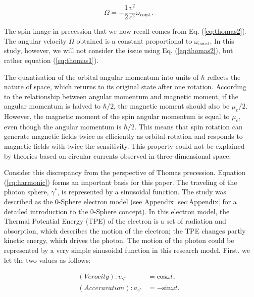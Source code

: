 \documentclass[%
 reprint,
 amsmath,amssymb,
 aps,
]{revtex4-1}
\numberwithin{equation}{section}%
\begin{document}
\begin{equation}
    {\Omega}= - \frac{1}{2} \frac{v^2}{c^2} \omega_{\mathrm{const}}.
    \label{eq:thomas2}
\end{equation}

The spin image in precession that we now recall comes from Eq. (\ref{eq:thomas2}). The angular velocity $\Omega$ obtained is a constant proportional to $\omega_{\mathrm{const}}$. In this study, however, we will not consider the issue using Eq. (\ref{eq:thomas2}), but rather equation (\ref{eq:thomas1}).

    
The quantisation of the orbital angular momentum into units of $\hbar$ reflects the nature of space, which returns to its original state after one rotation. According to the relationship between angular momentum and magnetic moment, if the angular momentum is halved to $\hbar/2$, the magnetic moment should also be $\mu_e/2$. However, the magnetic moment of the spin angular momentum is equal to $\mu_e$, even though the angular momentum is $\hbar/2$. This means that spin rotation can generate magnetic fields twice as efficiently as orbital rotation and responds to magnetic fields with twice the sensitivity. This property could not be explained by theories based on circular currents observed in three-dimensional space.

Consider this discrepancy from the perspective of Thomas precession. Equation (\ref{eq:harmonic}) forms an important basis for this paper. The traveling of the photon sphere, ${\gamma^{*}}$, is represented by a sinusoidal function. The study was described as the 0-Sphere electron model (see Appendix \ref{sec:Appendix} for a detailed introduction to the 0-Sphere concept). In this electron model, the Thermal Potential Energy (TPE) of the electron is a set of radiation and absorption, which describes the motion of the electron; the TPE changes partly kinetic energy, which drives the photon. The motion of the photon could be represented by a very simple sinusoidal function in this research model. First, we let the two values as follows;

\begin{equation}
    \begin{split}
        (Verocity): v_{\gamma^{*}}
            &= \mathrm{cos}\omega t , \\
        (Acceraration): a_{\gamma^{*}}
            &= - \mathrm{sin}\omega t
            .
    \label{eq:harmonic}
    \end{split}
\end{equation}
\end{document}
